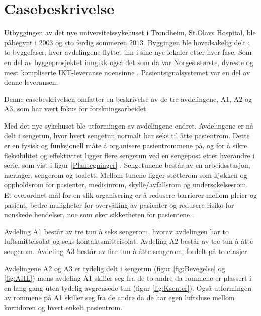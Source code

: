 \chapter{Casebeskrivelse}
\label{chp:case}
Utbyggingen av det nye universitetssykehuset i Trondheim, St.Olavs Hospital, ble påbegynt i 2003 og sto ferdig sommeren 2013. Byggingen ble hovedsakelig delt i to byggefaser, hvor avdelingene flyttet inn i sine nye lokaler etter hver fase. Som en del av byggeprosjektet inngikk også det som da var Norges største, dyreste og mest kompliserte IKT-leveranse noensinne \citep{TU}. Pasientsignalsystemet var en del av denne leveransen. 

\noindent
Denne casebeskrivelsen omfatter en beskrivelse av de tre avdelingene, A1, A2 og A3, som har vært fokus for forskningsarbeidet. 

\noindent
Med det nye sykehuset ble utformingen av avdelingene endret. Avdelingene er nå delt i sengetun, hvor hvert sengetun normalt har seks til åtte pasientrom. Dette er en fysisk og funksjonell måte å organisere pasientrommene på, og for å sikre fleksibilitet og effektivitet ligger flere sengetun ved en sengepost etter hverandre i serie, som vist i figur \ref{Plantegninger} \citep{Aslaksen, sykehuskart}. Sengetunene består av en arbeidsstasjon, nærlager, sengerom og toalett. Mellom tunene ligger støtterom som kjøkken og oppholdsrom for pasienter, medisinrom, skylle/avfallsrom og undersøkelsesrom. Et overordnet mål for en slik organisering er å redusere barrierer mellom pleier og pasient, bedre muligheter for overvåking av pasienter og redusere risiko for uønskede hendelser, noe som øker sikkerheten for pasientene \citep{Sintef-sengetun}.

\noindent
Avdeling A1 består av tre tun à seks sengerom, hvorav avdelingen har to luftsmitteisolat og seks kontaktsmitteisolat. Avdeling A2 består av tre tun à åtte sengerom. Avdeling A3 består av fire tun à åtte sengerom, fordelt på to etasjer.

\noindent
Avdelingene A2 og A3 er tydelig delt i sengetun (figur \ref{fig:Bevegelse} og \ref{fig:AHL}) mens avdeling A1 skiller seg fra de to andre da rommene er plassert i en lang gang uten tydelig avgrensede tun (figur \ref{fig:Ksenter}). Også utformingen av rommene på A1 skiller seg fra de andre da de har egen luftsluse mellom korridoren og hvert enkelt pasientrom.

